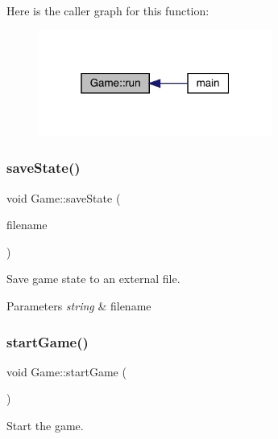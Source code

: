 Here is the caller graph for this function\+:\nopagebreak
\begin{figure}[H]
\begin{center}
\leavevmode
\includegraphics[width=217pt]{class_game_a1ab78f5ed0d5ea879157357cf2fb2afa_icgraph}
\end{center}
\end{figure}
\mbox{\label{class_game_a1d537d2349fb33959018a02eccea1c79}} 
\subsubsection{\texorpdfstring{save\+State()}{saveState()}}
{\footnotesize\ttfamily void Game\+::save\+State (\begin{DoxyParamCaption}\item[{string}]{filename }\end{DoxyParamCaption})}



Save game state to an external file. 


\begin{DoxyParams}{Parameters}
{\em string} & filename \\
\hline
\end{DoxyParams}
\mbox{\label{class_game_ae8638ccdb0ef3bf39a6affa30aa1258f}} 
\subsubsection{\texorpdfstring{start\+Game()}{startGame()}}
{\footnotesize\ttfamily void Game\+::start\+Game (\begin{DoxyParamCaption}{ }\end{DoxyParamCaption})}



Start the game. 

